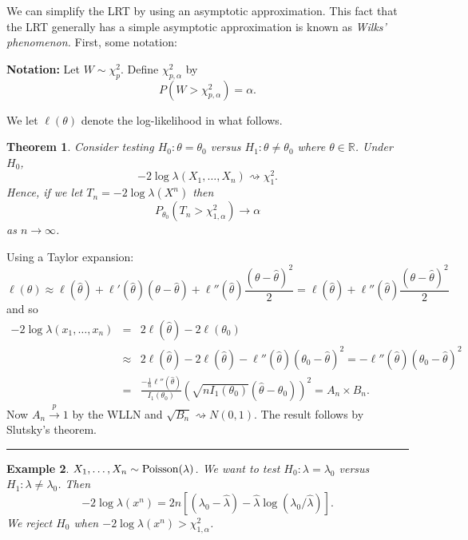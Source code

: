 \documentclass[twoside,12pt]{article}
\newcounter{lecnum}
\newtheorem{theorem}{Theorem}[lecnum]
\newtheorem{example}[theorem]{Example}
\newenvironment{proof}{{\bf Proof:}}{\hfill\rule{2mm}{2mm}}
\newcommand{\cprob}{\overset{p}{\rightarrow}}
\begin{document}
We can simplify the LRT by using an asymptotic approximation.
This fact that the LRT generally has a simple asymptotic approximation is known as \emph{Wilks' phenomenon.}
First, some notation:

\vspace{1cm}

{\bf Notation:} Let $W\sim \chi^2_p$.
Define $\chi^2_{p,\alpha}$ by
$$
P(W > \chi^2_{p,\alpha}) = \alpha.
$$

\vspace{1cm}

We let $\ell(\theta)$ denote the log-likelihood in what follows.
\begin{theorem}
Consider testing
$H_0:\theta=\theta_0$ versus
$H_1:\theta \neq \theta_0$ 
where $\theta\in\mathbb{R}$.
Under $H_0$,
$$
-2\log \lambda(X_1,\ldots, X_n) \rightsquigarrow \chi_1^2.
$$
Hence, if we let $T_n = -2\log \lambda(X^n)$
then
$$
P_{\theta_0} (T_n > \chi^2_{1,\alpha}) \to \alpha
$$
as $n\to\infty$.
\end{theorem}



\begin{proof}
Using a Taylor expansion:
$$
\ell(\theta) \approx \ell(\widehat\theta) + \ell'(\widehat\theta)(\theta-\widehat\theta) + 
\ell''(\widehat\theta) \frac{(\theta-\widehat\theta)^2}{2} =
\ell(\widehat\theta) +  \ell''(\widehat\theta) \frac{(\theta-\widehat\theta)^2}{2}
$$
and so
\begin{eqnarray*}
-2\log \lambda(x_1,\ldots, x_n) &=& 2\ell(\widehat\theta) - 2\ell(\theta_0)\\
& \approx &
2\ell(\widehat\theta)
-2\ell(\widehat\theta) -  \ell''(\widehat\theta) (\theta_0-\widehat\theta)^2 =
-  \ell''(\widehat\theta) (\theta_0-\widehat\theta)^2 \\
&=&
\frac{-\frac{1}{n} \ell''(\widehat\theta)}{I_1(\theta_0)}
 (\sqrt{n I_1(\theta_0)}(\widehat\theta-\theta_0))^2 = A_n \times B_n.
\end{eqnarray*}
Now $A_n\cprob 1$ by the WLLN and
$\sqrt{B_n}\rightsquigarrow N(0,1)$.
The result follows by Slutsky's theorem.
\end{proof}

\begin{example}
$X_1,\ldots, X_n \sim {\rm Poisson}(\lambda)$.
We want to test
$H_0:\lambda = \lambda_0$ versus
$H_1:\lambda \neq \lambda_0$.
Then
$$
-2\log \lambda(x^n) = 2n[(\lambda_0 - \widehat\lambda) - \widehat\lambda \log(\lambda_0/\widehat\lambda)].
$$
We reject $H_0$ when
$-2\log \lambda(x^n) > \chi^2_{1,\alpha}$.
\end{example}
\end{document}
